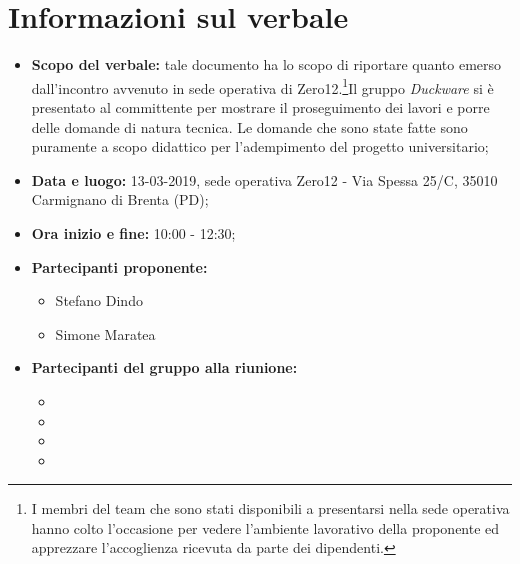 \clearpage
\section{Informazioni sul verbale}
\begin{itemize}
	\item \textbf {Scopo del verbale:} tale documento ha lo scopo di riportare quanto emerso dall'incontro avvenuto in sede operativa di Zero12.\footnote{I membri del team che sono stati disponibili a presentarsi nella sede operativa hanno colto l'occasione per vedere l'ambiente lavorativo della proponente ed apprezzare l'accoglienza ricevuta da parte dei dipendenti.}{Il gruppo \emph{Duckware} si è presentato al committente per mostrare il proseguimento dei lavori e porre delle domande di natura tecnica}. Le domande che sono state fatte sono puramente a scopo didattico per l'adempimento del progetto universitario;
	\item \textbf {Data e luogo:} 13-03-2019, sede operativa Zero12 - Via Spessa 25/C, 35010 Carmignano di Brenta (PD);
	\item \textbf {Ora inizio e fine:} 10:00 - 12:30;
	\item \textbf {Partecipanti proponente:} 
		\begin{itemize}
			\item Stefano Dindo
			\item Simone Maratea
		\end{itemize}
	\item \textbf {Partecipanti del gruppo alla riunione:} 
		 \begin{itemize}
			\item \sonia
			\item \luca
			\item \matteo
			\item \andrea
		\end{itemize}
\end{itemize}